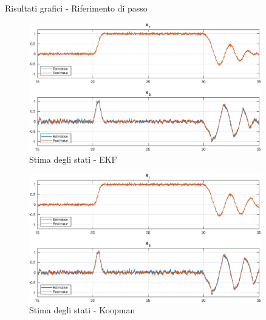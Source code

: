 \documentclass{beamer}
\begin{document}
\begin{frame}[allowframebreaks]{Risultati grafici - Riferimento di passo}
    \begin{figure}
        \centering
        \includegraphics[width=0.9\textwidth]{Figures/step_reference_kalman.eps}
        \caption{Stima degli stati - EKF}
    \end{figure}

    \begin{figure}
        \centering
        \includegraphics[width=0.9\textwidth]{Figures/step_reference_koopman.eps}
        \caption{Stima degli stati - Koopman}
    \end{figure}
\end{frame}
\end{document}
